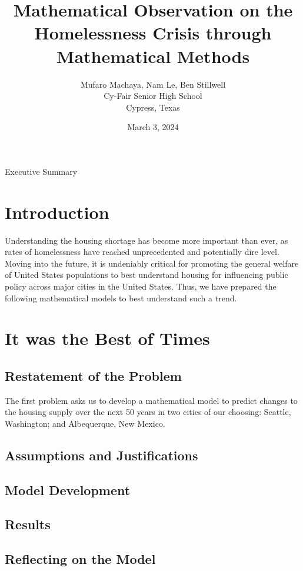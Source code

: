 \documentclass[12pt]{article}
\title{Mathematical Observation on the Homelessness Crisis through Mathematical Methods}
\author{Mufaro Machaya, Nam Le, Ben Stillwell \\ Cy-Fair Senior High School \\ Cypress, Texas}
\date{March 3, 2024}
\begin{document}
\newpage

\large{Executive Summary}
\blindtext

\maketitle
\newpage
\tableofcontents

\newpage

\section{Introduction}
Understanding the housing shortage has become more important than ever, as rates of homelessness have reached
unprecedented and potentially dire level\cite{Census2010ACSDP1Y2010.DP04}. Moving into the future, it is
undeniably critical for promoting the general welfare of United States populations to best understand housing for
influencing public policy across major cities in the United States. Thus, we have prepared the following mathematical
models to best understand such a trend.

\newpage

\section{It was the Best of Times}

\subsection{Restatement of the Problem}
The first problem asks us to develop a mathematical model to predict changes to the housing supply over the next 50
years in two cities of our choosing: Seattle, Washington; and Albequerque, New Mexico.

\subsection{Assumptions and Justifications}
\subsection{Model Development}
\subsection{Results}
\subsection{Reflecting on the Model}
\end{document}
